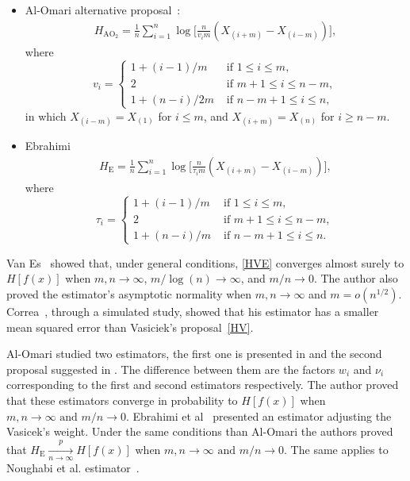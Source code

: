 \documentclass[journal]{IEEEtran}
\begin{document}
\begin{itemize}
	\item Al-Omari alternative proposal~\cite{AlOmari2016}:
	\label{AO2}
	\begin{align}
		H_{{\text{AO}}_2}=\frac{1}{n} \sum_{i=1}^{n} \log \Big[\frac{n}{v_{i} m}\left(X_{(i+m)}-X_{(i-m)}\right)\Big],
	\end{align}
	where
	\begin{equation*}
		v_{i}=\begin{cases}
			1+(i-1)/m & \text{ if }1 \leq i \leq m, \\
			2 & \text{ if } m+1 \leq i \leq n-m, \\
			1+(n-i)/2m & \text{ if } n-m+1 \leq i \leq n,
		\end{cases}
	\end{equation*}
	in which $X_{(i-m)}=X_{(1)}$ for $i \leq m$, and $X_{(i+m)}=X_{(n)}$ for $i \geq n-m$.
	\item Ebrahimi~\cite{Ebrahimi94}
	\begin{align}
		H_\text{E}=\frac{1}{n} \sum_{i=1}^{n} \log \Big[\frac{n}{\tau_{i} m}\left(X_{(i+m)}-X_{(i-m)}\right)\Big],
		\label{HE}
	\end{align}
	where
	\begin{equation*}
		\tau_{i}=\begin{cases}
			1+(i-1)/m & \text{ if }1 \leq i \leq m, \\
			2 & \text{ if } m+1 \leq i \leq n-m, \\
			1+(n-i)/m & \text{ if } n-m+1 \leq i \leq n.
		\end{cases}
	\end{equation*}
\end{itemize}

Van Es~\cite{VanEs92} showed that, under general conditions, \eqref{HVE} converges almost surely to $H[f(x)]$ when $m, n \to \infty$, $m/\log(n) \to \infty$, and $m/n \to 0$.
The author also proved the estimator's asymptotic normality when $m, n \to \infty$ and $m = o(n^{1/2})$. 
Correa~\cite{Correa95}, through a simulated study, showed that his estimator has a smaller mean squared error than Vasiciek's  proposal~\eqref{HV}. 

Al-Omari studied two estimators, the first one is presented in \cite{AlOmari2014} and the second proposal suggested in \cite{AlOmari2016}. The difference between them are the factors $w_i$ and $\nu_i$ corresponding to the first and second estimators respectively.
The author proved that these estimators converge in probability to $ H[f(x)]$ when $m, n \to \infty  \text{ and } m/n \to 0$. 
Ebrahimi et al~\cite{Ebrahimi94} presented an estimator adjusting the Vasicek's\cite{Vasicek76} weight. 
Under the same conditions than Al-Omari\cite{AlOmari2014} the authors proved that $H_{\text{E}}\underset{n \to \infty}{\overset{p}{\longrightarrow}} H[f(x)]$ when $m, n \to \infty  \text{ and } m/n \to 0$. 
The same applies to Noughabi et al. estimator~\cite{Noughabi2010}.
\end{document}
